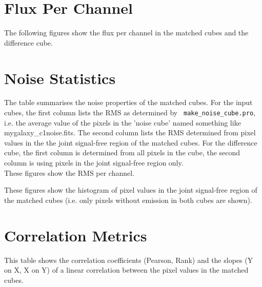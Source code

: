 \documentclass[11pt]{article}
\begin{document}
\section{Flux Per Channel}
\label{sect:perchannel}
%

\noindent The following figures show the flux per channel in the matched cubes and the difference cube.




%

\section{Noise Statistics}
\label{sec:noise_stats}

\noindent The table summarises the noise properties of the matched cubes. For the
input cubes, the first column lists the RMS as determined by {\tt
  make\_noise\_cube.pro}, i.e. the average value of the pixels in the
'noise cube' named something like mygalaxy\_c1noise.fits. The second
column lists the RMS determined from pixel values in the the joint
signal-free region of the matched cubes. For the difference cube, the
first column is determined from all pixels in the cube, the second
column is using pixels in the joint signal-free region only.\\



\noindent These figures show the RMS per channel.




\noindent These figures show the histogram of pixel values in the
joint signal-free region of the matched cubes (i.e. only pixels
without emission in both cubes are shown).





\section{Correlation Metrics}
\label{sec:correlation_stats}

\noindent This table shows the correlation coefficients (Pearson,
Rank) and the slopes (Y on X, X on Y) of a linear correlation between
the pixel values in the matched cubes.


\end{document}
